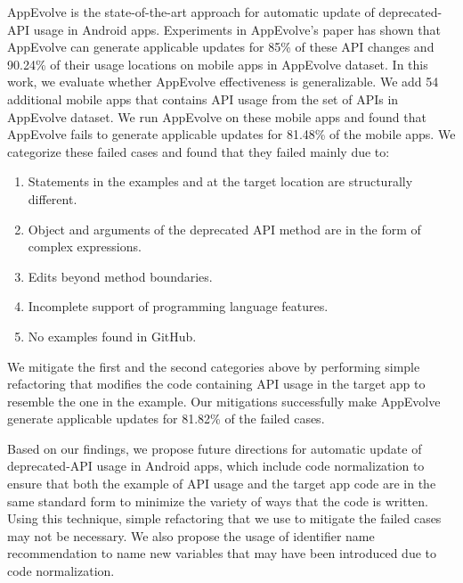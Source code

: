 AppEvolve is the state-of-the-art approach for automatic update of deprecated-API usage in Android apps. Experiments in AppEvolve's paper has shown that AppEvolve can generate applicable updates for 85\% of these API changes and 90.24\% of their usage locations on mobile apps in AppEvolve dataset. In this work, we evaluate whether AppEvolve effectiveness is generalizable. We add 54 additional mobile apps that contains API usage from the set of APIs in AppEvolve dataset. We run AppEvolve on these mobile apps and found that AppEvolve fails to generate applicable updates for 81.48\% of the mobile apps. We categorize these failed cases and found that they failed mainly due to:
\begin{enumerate}
    \item Statements in the examples and at the target location are structurally different.
    \item Object and arguments of the deprecated API method are in the form of complex expressions.
    \item Edits beyond method boundaries.
    \item Incomplete support of programming language features.
    \item No examples found in GitHub.
\end{enumerate}
We mitigate the first and the second categories above by performing simple refactoring that modifies the code containing API usage in the target app to resemble the one in the example. Our mitigations successfully make AppEvolve generate applicable updates for 81.82\% of the failed cases. 

Based on our findings, we propose future directions for automatic update of deprecated-API usage in Android apps, which include code normalization to ensure that both the example of API usage and the target app code are in the same standard form to minimize the variety of ways that the code is written. Using this technique, simple refactoring that we use to mitigate the failed cases may not be necessary. We also propose the usage of identifier name recommendation to name new variables that may have been introduced due to code normalization.